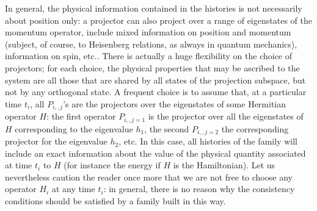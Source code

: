 \documentclass[12pt,onecolumn]{article}%
\begin{document}
In general, the physical information contained in the histories is not
necessarily about position only: a projector can also project over a range of
eigenstates of the momentum operator, include mixed information on position
and momentum (subject, of course, to Heisenberg relations, as always in
quantum mechanics), information on spin, etc.. There is actually a huge
flexibility on the choice of projectors; for each choice, the physical
properties that may be ascribed to the system are all those that are shared by
all states of the projection subspace, but not by any orthogonal state. A
frequent choice is to assume that, at a particular time $t_{i}$, all
$P_{i,,j}$'s are the projectors over the eigenstates of some Hermitian
operator $H$: the first operator $P_{i,,j=1}$ is the projector over all the
eigenstates of $H$ corresponding to the eigenvalue $h_{1}$, the second
$P_{i,,j=2}$ the corresponding projector for the eigenvalue $h_{2}$, etc. In
this case, all histories of the family will include an exact information about
the value of the physical quantity associated at time $t_{i}$ to $H$ (for
instance the energy if $H$ is the Hamiltonian). Let us nevertheless caution
the reader once more that we are not free to choose any operator $H_{i}$ at
any time $t_{i}$: in general, there is no reason why the consistency
conditions should be satisfied by a family built in this way.
\end{document}
